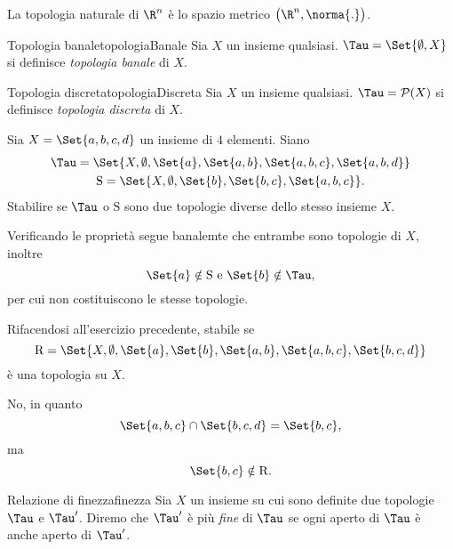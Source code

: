 \begin{ese}
    La topologia naturale di \(\R^n\) è lo spazio metrico \(\big(\R^n,\norma{.}\big)\).
\end{ese}

\begin{defn}{Topologia banale}{topologiaBanale}
    Sia \(X\) un insieme qualsiasi.
    \(\Tau=\Set{\emptyset,X}\) si definisce \emph{topologia banale} di \(X\).
\end{defn}

\begin{defn}{Topologia discreta}{topologiaDiscreta}
    Sia \(X\) un insieme qualsiasi.
    \(\Tau=\mathcal{P}(X)\) si definisce \emph{topologia discreta} di \(X\).
\end{defn}

\begin{exe}
    Sia \(X=\Set{a,b,c,d}\) un insieme di \(4\) elementi.
    Siano
    \begin{gather*}
        \Tau=\Set{X,\emptyset,\Set{a},\Set{a,b},\Set{a,b,c},\Set{a,b,d}}\\
        \mathrm{S}=\Set{X,\emptyset,\Set{b},\Set{b,c},\Set{a,b,c}}.
    \end{gather*}
    Stabilire se \(\Tau\) o \(\mathrm{S}\) sono due topologie diverse dello stesso insieme \(X\).
\end{exe}

\begin{sol}
    Verificando le proprietà segue banalemte che entrambe sono topologie di \(X\), inoltre
    \[
        \Set{a}\notin \mathrm{S}\text{ e }\Set{b}\notin\Tau,
    \]
    per cui non costituiscono le stesse topologie.
\end{sol}

\begin{exe}
    Rifacendosi all'esercizio precedente, stabile se
    \[
        \mathrm{R}=\Set{X,\emptyset,\Set{a},\Set{b},\Set{a,b},\Set{a,b,c},\Set{b,c,d}}
    \]
    è una topologia su \(X\).
\end{exe}

\begin{sol}
    No, in quanto
    \[
        \Set{a,b,c}\cap\Set{b,c,d}=\Set{b,c},
    \]
    ma
    \[
        \Set{b,c}\notin\mathrm{R}.
    \]
\end{sol}

\begin{defn}{Relazione di finezza}{finezza}
    Sia \(X\) un insieme su cui sono definite due topologie \(\Tau\) e \(\Tau'\).
    Diremo che \(\Tau'\) è più \emph{fine} di \(\Tau\) se ogni aperto di \(\Tau\) è anche aperto di \(\Tau'\).
\end{defn}

